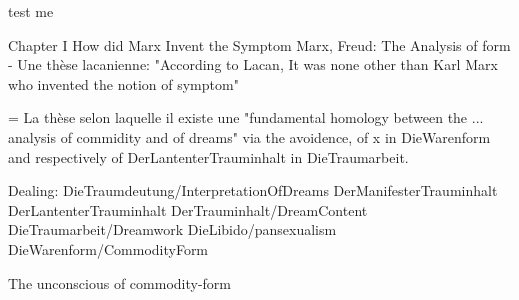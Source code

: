 test me

Chapter I How did Marx Invent the Symptom
Marx, Freud: The Analysis of form
- Une thèse lacanienne: "According to Lacan, It was none other than Karl Marx who invented the notion of symptom"

= La thèse selon laquelle il existe une "fundamental homology between the ... analysis of commidity and of dreams" via the avoidence, of x in DieWarenform and respectively of DerLantenterTrauminhalt in DieTraumarbeit.

Dealing: DieTraumdeutung/InterpretationOfDreams DerManifesterTrauminhalt DerLantenterTrauminhalt DerTrauminhalt/DreamContent DieTraumarbeit/Dreamwork DieLibido/pansexualism DieWarenform/CommodityForm


The unconscious of commodity-form
